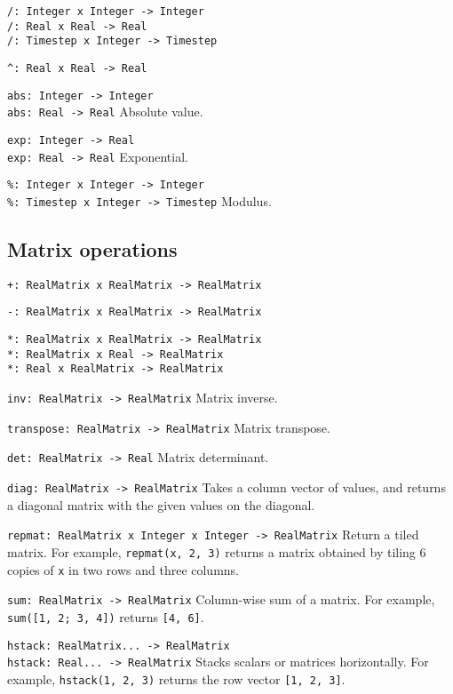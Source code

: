 \verb|/: Integer x Integer -> Integer| \\
\verb|/: Real x Real -> Real| \\
\verb|/: Timestep x Integer -> Timestep|

\verb|^: Real x Real -> Real|

\verb|abs: Integer -> Integer| \\
\verb|abs: Real -> Real| Absolute value.

\verb|exp: Integer -> Real| \\
\verb|exp: Real -> Real| Exponential.


\verb|%: Integer x Integer -> Integer| \\
\verb|%: Timestep x Integer -> Timestep| Modulus.


\subsection{Matrix operations}
\label{sec:builtin-matrix-ops}

\verb|+: RealMatrix x RealMatrix -> RealMatrix|

\verb|-: RealMatrix x RealMatrix -> RealMatrix|

\verb|*: RealMatrix x RealMatrix -> RealMatrix| \\
\verb|*: RealMatrix x Real -> RealMatrix| \\
\verb|*: Real x RealMatrix -> RealMatrix|

\verb|inv: RealMatrix -> RealMatrix| Matrix inverse.

\verb|transpose: RealMatrix -> RealMatrix| Matrix transpose.

\verb|det: RealMatrix -> Real| Matrix determinant.

\verb|diag: RealMatrix -> RealMatrix| Takes a column vector of values, and
returns a diagonal matrix with the given values on the diagonal.

\verb|repmat: RealMatrix x Integer x Integer -> RealMatrix| Return a tiled
matrix. For example, \verb|repmat(x, 2, 3)| returns a matrix obtained by tiling
6 copies of \verb|x| in two rows and three columns.

\verb|sum: RealMatrix -> RealMatrix| Column-wise sum of a matrix. For example,
\verb|sum([1, 2; 3, 4])| returns \verb|[4, 6]|.

\verb|hstack: RealMatrix... -> RealMatrix| \\
\verb|hstack: Real... -> RealMatrix| Stacks scalars or matrices horizontally.
For example, \verb|hstack(1, 2, 3)| returns the row vector {\tt [1, 2, 3]}.

